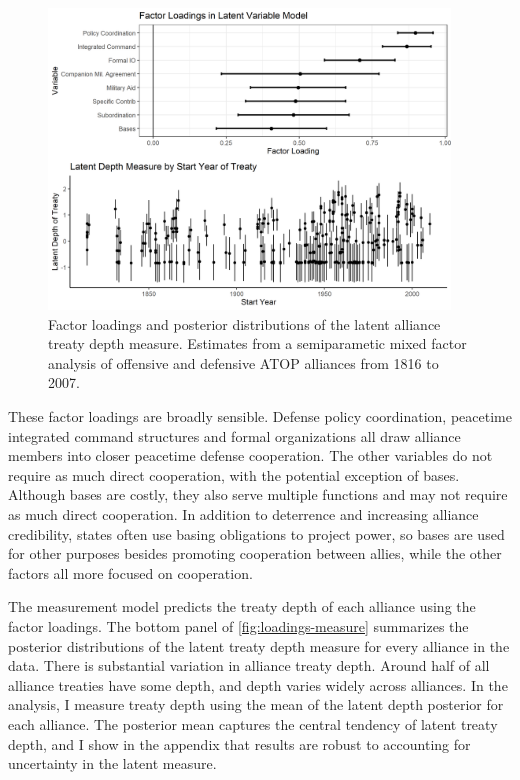 \documentclass[12pt]{article}
\begin{document}
\begin{figure}[hbtp]
\centering
\includegraphics[width=0.95\textwidth]{../figures/loadings-measure.png}
\caption{Factor loadings and posterior distributions of the latent alliance treaty depth measure. Estimates from a semiparametic mixed factor analysis of offensive and defensive ATOP alliances from 1816 to 2007.}
\label{fig:loadings-measure}
\end{figure}


These factor loadings are broadly sensible. 
Defense policy coordination, peacetime integrated command structures and formal organizations all draw alliance members into closer peacetime defense cooperation. 
The other variables do not require as much direct cooperation, with the potential exception of bases.
Although bases are costly, they also serve multiple functions and may not require as much direct cooperation. 
In addition to deterrence and increasing alliance credibility, states often use basing obligations to project power, so bases are used for other purposes besides promoting cooperation between allies, while the other factors all more focused on cooperation.  


The measurement model predicts the treaty depth of each alliance using the factor loadings. 
The bottom panel of \autoref{fig:loadings-measure} summarizes the posterior distributions of the latent treaty depth measure for every alliance in the data. 
There is substantial variation in alliance treaty depth. 
Around half of all alliance treaties have some depth, and depth varies widely across alliances.
In the analysis, I measure treaty depth using the mean of the latent depth posterior for each alliance. 
The posterior mean captures the central tendency of latent treaty depth, and I show in the appendix that results are robust to accounting for uncertainty in the latent measure. 
\end{document}

